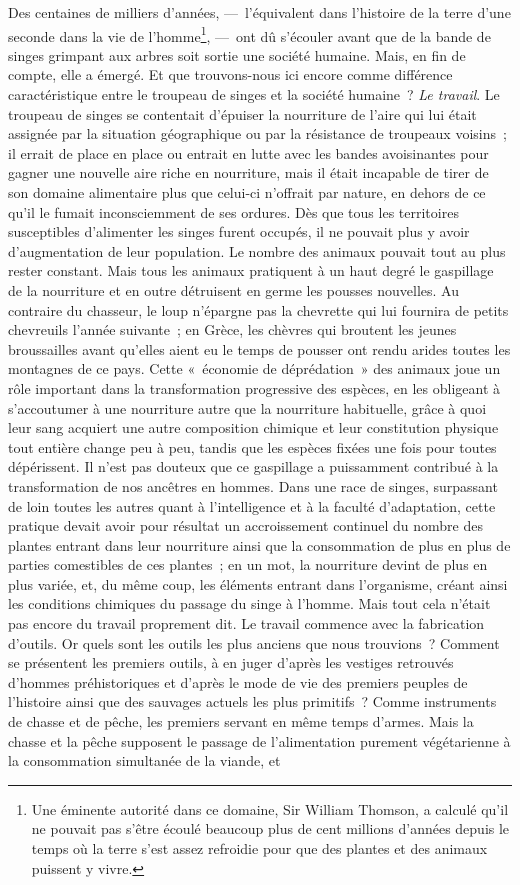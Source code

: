 \documentclass[french,twoside]{book} %
\begin{document}
Des centaines de milliers d’années, — l’équivalent dans l’histoire de la terre d’une seconde dans la vie de l’homme\footnote{Une éminente autorité dans ce domaine, Sir William Thomson, a calculé qu’il ne pouvait pas s’être écoulé beaucoup plus de cent millions d’années depuis le temps où la terre s’est assez refroidie pour que des plantes et des animaux puissent y vivre.}, — ont dû s’écouler avant que de la bande de singes grimpant aux arbres soit sortie une société humaine. Mais, en fin de compte, elle a émergé. Et que trouvons-nous ici encore comme différence caractéristique entre le troupeau de singes et la société humaine ? \emph{Le travail}. Le troupeau de singes se contentait d’épuiser la nourriture de l’aire qui lui était assignée par la situation géographique ou par la résistance de troupeaux voisins ; il errait de place en place ou entrait en lutte avec les bandes avoisinantes pour gagner une nouvelle aire riche en nourriture, mais il était incapable de tirer de son domaine alimentaire plus que celui-ci n’offrait par nature, en dehors de ce qu’il le fumait inconsciemment de ses ordures. Dès que tous les territoires susceptibles d’alimenter les singes furent occupés, il ne pouvait plus y avoir d’augmentation de leur population. Le nombre des animaux pouvait tout au plus rester constant. Mais tous les animaux pratiquent à un haut degré le gaspillage de la nourriture et en outre détruisent en germe les pousses nouvelles. Au contraire du chasseur, le loup n’épargne pas la chevrette qui lui fournira de petits chevreuils l’année suivante ; en Grèce, les chèvres qui broutent les jeunes broussailles avant qu’elles aient eu le temps de pousser ont rendu arides toutes les montagnes de ce pays. Cette « économie de déprédation » des animaux joue un rôle important dans la transformation progressive des espèces, en les obligeant à s’accoutumer à une nourriture autre que la nourriture habituelle, grâce à quoi leur sang acquiert une autre composition chimique et leur constitution physique tout entière change peu à peu, tandis que les espèces fixées une fois pour toutes dépérissent. Il n’est pas douteux que ce gaspillage a puissamment contribué à la transformation de nos ancêtres en hommes. Dans une race de singes, surpassant de loin toutes les autres quant à l’intelligence et à la faculté d’adaptation, cette pratique devait avoir pour résultat un accroissement continuel du nombre des plantes entrant dans leur nourriture ainsi que la consommation de plus en plus de parties comestibles de ces plantes ; en un mot, la nourriture devint de plus en plus variée, et, du même coup, les éléments entrant dans l’organisme, créant ainsi les conditions chimiques du passage du singe à l’homme. Mais tout cela n’était pas encore du travail proprement dit. Le travail commence avec la fabrication d’outils. Or quels sont les outils les plus anciens que nous trouvions ? Comment se présentent les premiers outils, à en juger d’après les vestiges retrouvés d’hommes préhistoriques et d’après le mode de vie des premiers peuples de l’histoire ainsi que des sauvages actuels les plus primitifs ? Comme instruments de chasse et de pêche, les premiers servant en même temps d’armes. Mais la chasse et la pêche supposent le passage de l’alimentation purement végétarienne à la consommation simultanée de la viande, et 
\end{document}
